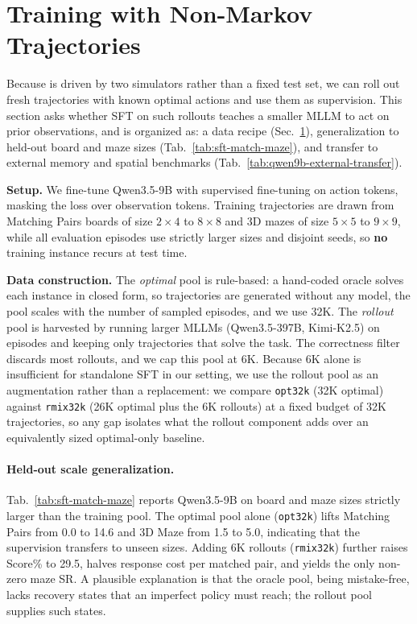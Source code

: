 \section{Training with Non-Markov Trajectories}
\label{sec:training_strategy}

Because \benchname{} is driven by two simulators rather than a fixed test set, we can roll out fresh trajectories with known optimal actions and use them as supervision. This section asks whether SFT on such rollouts teaches a smaller MLLM to act on prior observations, and is organized as: a data recipe (Sec.~\ref{sec:training_strategy}), generalization to held-out board and maze sizes (Tab.~\ref{tab:sft-match-maze}), and transfer to external memory and spatial benchmarks (Tab.~\ref{tab:qwen9b-external-transfer}).

\noindent \textbf{Setup.}
We fine-tune Qwen3.5-9B with supervised fine-tuning on action tokens, masking the loss over observation tokens.
Training trajectories are drawn from Matching Pairs boards of size $2{\times}4$ to $8{\times}8$ and 3D mazes of size $5{\times}5$ to $9{\times}9$, while all evaluation episodes use strictly larger sizes and disjoint seeds, so \textbf{no} training instance recurs at test time.

\noindent \textbf{Data construction.}
The \emph{optimal} pool is rule-based: a hand-coded oracle solves each instance in closed form, so trajectories are generated without any model, the pool scales with the number of sampled episodes, and we use 32K. The \emph{rollout} pool is harvested by running larger MLLMs (Qwen3.5-397B, Kimi-K2.5) on \benchname{} episodes and keeping only trajectories that solve the task. The correctness filter discards most rollouts, and we cap this pool at 6K. Because 6K alone is insufficient for standalone SFT in our setting, we use the rollout pool as an augmentation rather than a replacement: we compare \texttt{opt32k} (32K optimal) against \texttt{rmix32k} (26K optimal plus the 6K rollouts) at a fixed budget of 32K trajectories, so any gap isolates what the rollout component adds over an equivalently sized optimal-only baseline.

\paragraph{Held-out scale generalization.}
Tab.~\ref{tab:sft-match-maze} reports Qwen3.5-9B on board and maze sizes strictly larger than the training pool. The optimal pool alone (\texttt{opt32k}) lifts Matching Pairs from 0.0 to 14.6 and 3D Maze from 1.5 to 5.0, indicating that the supervision transfers to unseen sizes. Adding 6K rollouts (\texttt{rmix32k}) further raises Score\% to 29.5, halves response cost per matched pair, and yields the only non-zero maze SR. A plausible explanation is that the oracle pool, being mistake-free, lacks recovery states that an imperfect policy must reach; the rollout pool supplies such states.


